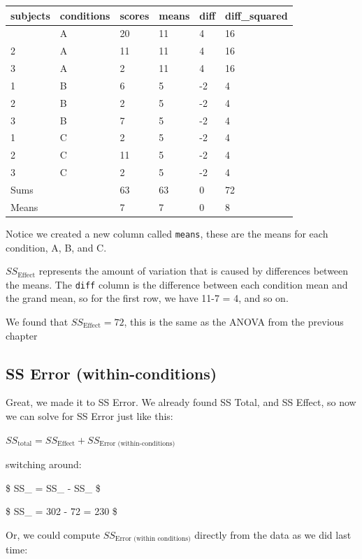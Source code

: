 \documentclass[
  letterpaper,
  DIV=11,
  numbers=noendperiod]{scrreprt}
\begin{document}
\begin{longtable}[]{@{}llllll@{}}
\toprule\noalign{}
subjects & conditions & scores & means & diff & diff\_squared \\
\midrule\noalign{}
\endhead
\bottomrule\noalign{}
\endlastfoot
1 & A & 20 & 11 & 4 & 16 \\
2 & A & 11 & 11 & 4 & 16 \\
3 & A & 2 & 11 & 4 & 16 \\
1 & B & 6 & 5 & -2 & 4 \\
2 & B & 2 & 5 & -2 & 4 \\
3 & B & 7 & 5 & -2 & 4 \\
1 & C & 2 & 5 & -2 & 4 \\
2 & C & 11 & 5 & -2 & 4 \\
3 & C & 2 & 5 & -2 & 4 \\
Sums & & 63 & 63 & 0 & 72 \\
Means & & 7 & 7 & 0 & 8 \\
\end{longtable}

Notice we created a new column called \texttt{means}, these are the
means for each condition, A, B, and C.

\(SS_\text{Effect}\) represents the amount of variation that is caused
by differences between the means. The \texttt{diff} column is the
difference between each condition mean and the grand mean, so for the
first row, we have 11-7 = 4, and so on.

We found that \(SS_\text{Effect} = 72\), this is the same as the ANOVA
from the previous chapter

\subsection{SS Error
(within-conditions)}\label{ss-error-within-conditions}

Great, we made it to SS Error. We already found SS Total, and SS Effect,
so now we can solve for SS Error just like this:

\(SS_\text{total} = SS_\text{Effect} + SS_\text{Error (within-conditions)}\)

switching around:

\$ SS\_ = SS\_ - SS\_ \$

\$ SS\_ = 302 - 72 = 230 \$

Or, we could compute \(SS_\text{Error (within conditions)}\) directly
from the data as we did last time:
\end{document}
